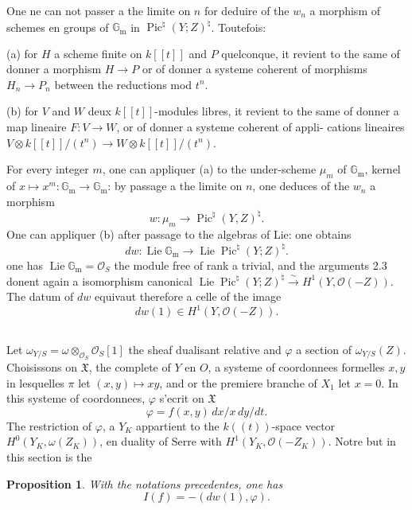 \documentclass[12pt,a4paper]{article}
\theoremstyle{plain}
\newtheorem{proposition}{Proposition}
\theoremstyle{definition}
\theoremstyle{remark}
\DeclareMathOperator{\Lie}{Lie}
\DeclareMathOperator{\Pic}{Pic}
\newcommand{\OO}{\mathcal{O}}
\newcommand{\Gm}{\mathbb{G}_{\mathrm{m}}}
\providecommand{\Gm}{\mathbb{G}_{\mathrm m}}
\providecommand{\Lie}{\operatorname{Lie}}
\begin{document}
One ne can not passer a the limite on $n$ for deduire of the $w_n$ a morphism
of schemes en groups of $\Gm$ in $\Pic^\natural(Y;Z)^\natural$. Toutefois:

(a) for $H$ a scheme finite on $k[[t]]$ and $P$ quelconque, it revient to the same of
donner a morphism $H\to P$ or of donner a systeme coherent of morphisms
$H_n\to P_n$ between the reductions mod $t^n$.

(b) for $V$ and $W$ deux $k[[t]]$-modules libres, it revient to the same of donner
a map lineaire $F:V\to W$, or of donner a systeme coherent of appli-
cations lineaires $V\otimes k[[t]]/(t^n)\to W\otimes k[[t]]/(t^n)$.

For every integer $m$, one can appliquer (a) to the under-scheme $\mu_m$ of $\Gm$, kernel
of $x\mapsto x^m:\Gm\to\Gm$: by passage a the limite on $n$, one deduces of the $w_n$ a
morphism
\begin{equation}\label{eq:2.4.9}
w:\mu_m\to\Pic^\natural(Y,Z)^\natural.
\end{equation}
One can appliquer (b) after passage to the algebras of Lie: one obtains
\begin{equation}\label{eq:2.4.10}
dw:\Lie\Gm\to\Lie\Pic^\natural(Y;Z)^\natural.
\end{equation}
one has $\Lie\Gm=\OO_S$ the module free of rank a trivial, and the arguments 2.3
donent again a isomorphism canonical
$\Lie\Pic^\natural(Y;Z)^\natural\xrightarrow{\sim} H^1(Y,\OO(-Z))$. The datum of $dw$ equivaut
therefore a celle of the image
\begin{equation}\label{eq:2.4.11}
dw(1)\in H^1(Y,\OO(-Z)).
\end{equation}

\subsection{}

Let $\omega_{Y/S}=\omega\otimes_{\OO_S}\OO_S[1]$ the sheaf dualisant relative and $\varphi$ a section of
$\omega_{Y/S}(Z)$. Choisissons on $\mathfrak{X}$, the complete of $Y$ en $O$, a systeme of coordonnees
formelles $x,y$ in lesquelles $\pi$ let $(x,y)\mapsto xy$, and or the premiere branche of $X_1$
let $x=0$. In this systeme of coordonnees, $\varphi$ s'ecrit on $\mathfrak{X}$
\[
\varphi=f(x,y)\,dx/x\,dy/dt.
\]
The restriction of $\varphi$, a $Y_K$ appartient to the $k((t))$-space vector
$H^0(Y_K,\omega(Z_K))$, en duality of Serre with $H^1(Y_K,\OO(-Z_K))$. Notre but in this section is the

\begin{proposition}\label{prop:2.5}
With the notations precedentes, one has
\begin{equation}\label{eq:2.5.1}
I(f)=-(dw(1),\varphi).
\end{equation}
\end{proposition}
\end{document}

